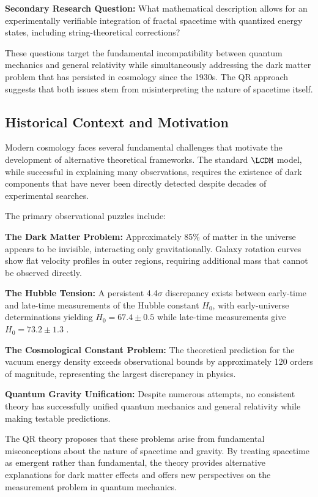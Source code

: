 \textbf{Secondary Research Question:} What mathematical description allows for an experimentally verifiable integration of fractal spacetime with quantized energy states, including string-theoretical corrections?

These questions target the fundamental incompatibility between quantum mechanics and general relativity while simultaneously addressing the dark matter problem that has persisted in cosmology since the 1930s. The QR approach suggests that both issues stem from misinterpreting the nature of spacetime itself.

\subsection{Historical Context and Motivation}
\label{subsec:historical-context}

Modern cosmology faces several fundamental challenges that motivate the development of alternative theoretical frameworks. The standard $\LCDM$ model, while successful in explaining many observations, requires the existence of dark components that have never been directly detected despite decades of experimental searches.

The primary observational puzzles include:

\textbf{The Dark Matter Problem:} Approximately 85\% of matter in the universe appears to be invisible, interacting only gravitationally. Galaxy rotation curves show flat velocity profiles in outer regions, requiring additional mass that cannot be observed directly.

\textbf{The Hubble Tension:} A persistent 4.4$\sigma$ discrepancy exists between early-time and late-time measurements of the Hubble constant $H_0$, with early-universe determinations yielding $H_0 = 67.4 \pm 0.5$ \kmsmpc while late-time measurements give $H_0 = 73.2 \pm 1.3$ \kmsmpc.

\textbf{The Cosmological Constant Problem:} The theoretical prediction for the vacuum energy density exceeds observational bounds by approximately 120 orders of magnitude, representing the largest discrepancy in physics.

\textbf{Quantum Gravity Unification:} Despite numerous attempts, no consistent theory has successfully unified quantum mechanics and general relativity while making testable predictions.

The QR theory proposes that these problems arise from fundamental misconceptions about the nature of spacetime and gravity. By treating spacetime as emergent rather than fundamental, the theory provides alternative explanations for dark matter effects and offers new perspectives on the measurement problem in quantum mechanics.

